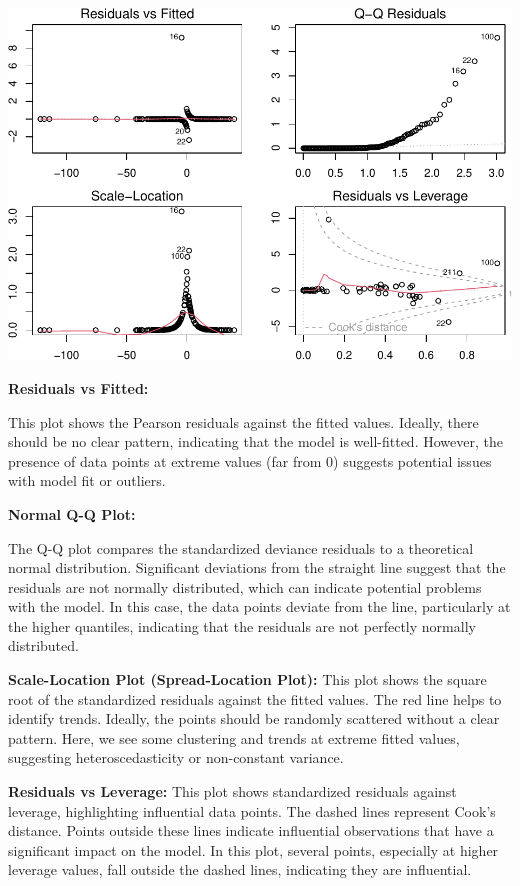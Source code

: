 \documentclass[
]{article}
\begin{document}
\begin{center}\includegraphics{Statistical_Learning_Final_Report_files/figure-latex/logistic_regression_evaluation_2-1} \end{center}

\textbf{Residuals vs Fitted:}

This plot shows the Pearson residuals against the fitted values.
Ideally, there should be no clear pattern, indicating that the model is
well-fitted. However, the presence of data points at extreme values (far
from 0) suggests potential issues with model fit or outliers.

\textbf{Normal Q-Q Plot:}

The Q-Q plot compares the standardized deviance residuals to a
theoretical normal distribution. Significant deviations from the
straight line suggest that the residuals are not normally distributed,
which can indicate potential problems with the model. In this case, the
data points deviate from the line, particularly at the higher quantiles,
indicating that the residuals are not perfectly normally distributed.

\textbf{Scale-Location Plot (Spread-Location Plot):} This plot shows the
square root of the standardized residuals against the fitted values. The
red line helps to identify trends. Ideally, the points should be
randomly scattered without a clear pattern. Here, we see some clustering
and trends at extreme fitted values, suggesting heteroscedasticity or
non-constant variance.

\textbf{Residuals vs Leverage:} This plot shows standardized residuals
against leverage, highlighting influential data points. The dashed lines
represent Cook's distance. Points outside these lines indicate
influential observations that have a significant impact on the model. In
this plot, several points, especially at higher leverage values, fall
outside the dashed lines, indicating they are influential.
\end{document}
